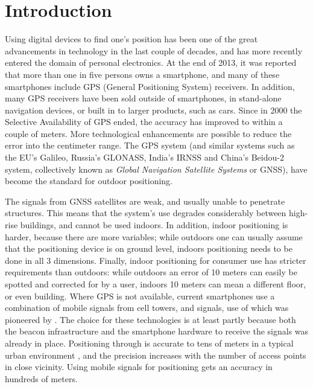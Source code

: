\chapter{Introduction}
\setcounter{page}{1} 

Using digital devices to find one's position has been one of the great advancements in technology in the last couple of decades, and has more recently entered the domain of personal electronics.
At the end of 2013, it was reported that more than one in five persons owns a smartphone, and many of these smartphones include GPS (General Positioning System) receivers.
In addition, many GPS receivers have been sold outside of smartphones, in stand-alone navigation devices, or built in to larger products, such as cars.
Since in 2000 the Selective Availability of GPS ended, the accuracy has improved to within a couple of meters.
More technological enhancements are possible to reduce the error into the centimeter range.
The GPS system (and similar systems such as the EU's Galileo, Russia's GLONASS, India's IRNSS and China's Beidou-2 system, collectively known as \emph{Global Navigation Satellite Systems} or GNSS), have become the standard for outdoor positioning.

The signals from GNSS satellites are weak, and usually unable to penetrate structures.
This means that the system's use degrades considerably between high-rise buildings, and cannot be used indoors.
In addition, indoor positioning is harder, because there are more variables; while outdoors one can usually assume that the positioning device is on ground level, indoors positioning needs to be done in all 3 dimensions.
Finally, indoor positioning for consumer use has stricter requirements than outdoors: while outdoors an error of 10 meters can easily be spotted and corrected for by a user, indoors 10 meters can mean a different floor, or even building. 
Where GPS is not available, current smartphones use a combination of mobile signals from cell towers, and \wifi signals, use of which was pioneered by \citet{bahl2000radar}.
The choice for these technologies is at least partly because both the beacon infrastructure and the smartphone hardware to receive the signals was already in place.
Positioning through \wifi is accurate to tens of meters in a typical urban environment \citep{zandbergen2009accuracy}, and the precision increases with the number of access points in close vicinity.
Using mobile signals for positioning gets an accuracy in hundreds of meters.

